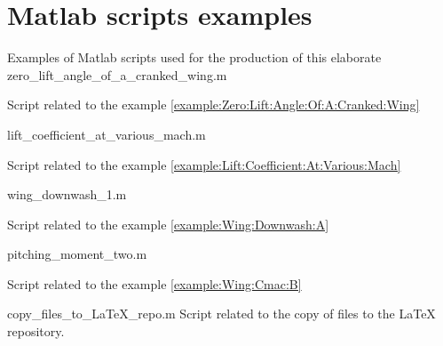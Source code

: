 \documentclass[[12pt,twoside]{book}
\begin{document}
\chapter%
   [Matlab scripts examples]%
   {Matlab scripts examples}
\label{chap:Appendix:Matlab:Scripts}
Examples of Matlab scripts used for the production of this  elaborate
%
    {zero_lift_angle_of_a_cranked_wing.m}

 Script related to the example \ref{example:Zero:Lift:Angle:Of:A:Cranked:Wing}
  
%
    {lift_coefficient_at_various_mach.m}

 Script related to the example \ref{example:Lift:Coefficient:At:Various:Mach}
  
%
    {wing_downwash_1.m}

 Script related to the example \ref{example:Wing:Downwash:A}
  
%
    {pitching_moment_two.m}
    
 Script related to the example \ref{example:Wing:Cmac:B}
  
%
    {copy_files_to_LaTeX_repo.m}
 Script related to the copy of files to the \LaTeX{} repository.
\end{document}
